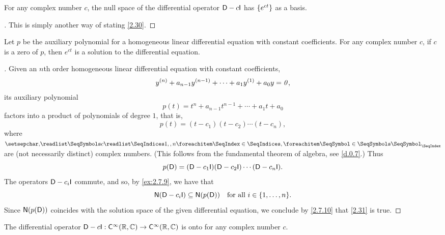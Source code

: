 \begin{cor}\label{2.7.10}
	For any complex number \(c\), the null space of the differential operator \(\Dop - c \IT\) has \(\left\lbrace e^{ct}\right\rbrace\) as a basis.
\end{cor}

\begin{proof}[]
	This is simply another way of stating \cref{2.30}.
\end{proof}

\begin{thm}\label{2.31}
	Let \(p\) be the auxiliary polynomial for a homogeneous linear differential equation with constant coefficients.
	For any complex number \(c\), if \(c\) is a zero of \(p\), then \(e^{ct}\) is a solution to the differential equation.
\end{thm}

\begin{proof}[]
	Given an \(n\)th order homogeneous linear differential equation with constant coefficients,
	\[
		y^{(n)} + a_{n - 1} y^{(n - 1)} + \cdots + a_1 y^{(1)} + a_0 y = \mathit{0},
	\]
	its auxiliary polynomial
	\[
		p(t) = t^n + a_{n - 1} t^{n - 1} + \cdots + a_1 t + a_0
	\]
	factors into a product of polynomials of degree \(1\), that is,
	\[
		p(t) = (t - c_1) (t - c_2) \cdots (t - c_n),
	\]
	where \(\seq{c}{1,,n}\) are (not necessarily distinct) complex numbers.
	(This follows from the fundamental theorem of algebra, see \cref{d.0.7}.)
	Thus
	\[
		p(\Dop) = (\Dop - c_1 \IT) (\Dop - c_2 \IT) \cdots (\Dop - c_n \IT).
	\]
	The operators \(\Dop - c_i \IT\) commute, and so, by \cref{ex:2.7.9}, we have that
	\[
		\ns{\Dop - c_i \IT} \subseteq \ns{p(\Dop)} \quad \text{for all } i \in \set{1, \dots, n}.
	\]
	Since \(\ns{p(\Dop)}\) coincides with the solution space of the given differential equation, we conclude by \cref{2.7.10} that \cref{2.31} is true.
\end{proof}

\begin{lem}\label{2.7.11}
	The differential operator \(\Dop - c \IT : \cfs[\infty](\R, \C) \to \cfs[\infty](\R, \C)\) is onto for any complex number \(c\).
\end{lem}


